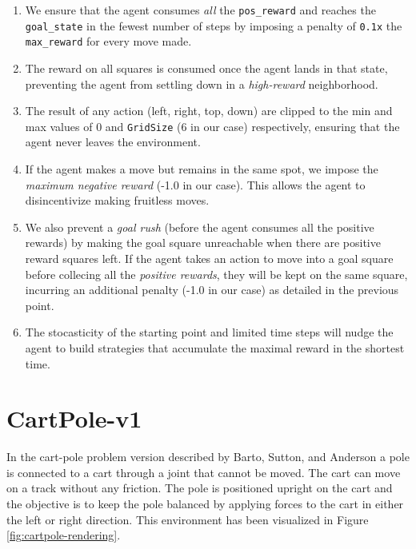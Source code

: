 \documentclass{article} %
\begin{document}
\begin{enumerate}
    \item We ensure that the agent consumes \textit{all} the \verb|pos_reward| and reaches
        the \verb|goal_state| in the fewest number of steps by imposing a penalty of \verb|0.1x|
        the \verb|max_reward| for every move made.
    \item The reward on all squares is consumed once the agent lands in that state, preventing 
    the agent from settling down in a \textit{high-reward} neighborhood.
    \item The result of any action (left, right, top, down) are clipped to the min and max
        values of 0 and \verb|GridSize| (6 in our case) respectively, ensuring that the
        agent never leaves the environment.
    \item If the agent makes a move but remains in the same spot, we impose the \textit{maximum negative
        reward} (-1.0 in our case). This allows the agent to disincentivize making fruitless
        moves.
    \item We also prevent a \textit{goal rush} (before the agent consumes all the positive
        rewards) by making the goal square unreachable when there are positive reward squares
        left. If the agent takes an action to move into a goal square before collecing all the
        \textit{positive rewards}, they will be kept on the same square, incurring an additional
        penalty (-1.0 in our case) as detailed in the previous point.
    \item The stocasticity of the starting point and limited time steps will nudge the agent
        to build strategies that accumulate the maximal reward in the shortest time.
\end{enumerate}

\section{CartPole-v1}
\label{sec:cart-definition}

In the cart-pole problem version described by Barto, Sutton, and Anderson 
\cite{barto1983neuronlike} a pole is
connected to a cart through a joint that cannot be moved. The cart can move on a track
without any friction. The pole is positioned upright on the cart and the objective is to
keep the pole balanced by applying forces to the cart in either the left or right direction.
This environment has been visualized in Figure \ref{fig:cartpole-rendering}.
\end{document}
